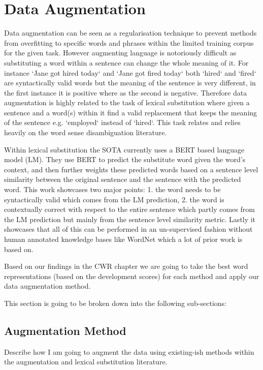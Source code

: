 \section{Data Augmentation}
Data augmentation can be seen as a regularisation technique to prevent methods from overfitting to specific words and phrases within the limited training corpus for the given task. However augmenting language is notoriously difficult as substituting a word within a sentence can change the whole meaning of it. For instance `Jane got hired today` and `Jane got fired today` both `hired` and `fired` are syntactically valid words but the meaning of the sentence is very different, in the first instance it is positive where as the second is negative. Therefore data augmentation is highly related to the task of lexical substitution \cite{mccarthy-navigli-2007-semeval} where given a sentence and a word(s) within it find a valid replacement that keeps the meaning of the sentence e.g. `employed` instead of `hired`. This task relates and relies heavily on the word sense disambiguation literature.

Within lexical substitution the SOTA currently \cite{zhou-etal-2019-bert} uses a BERT \cite{devlin-etal-2019-bert} based language model (LM). They use BERT to predict the substitute word given the word's context, and then further weights these predicted words based on a sentence level similarity between the original sentence and the sentence with the predicted word. This work showcases two major points: 1. the word needs to be syntactically valid which comes from the LM prediction, 2. the word is contextually correct with respect to the entire sentence which partly comes from the LM prediction but mainly from the sentence level similarity metric. Lastly it showcases that all of this can be performed in an un-supervised fashion without human annotated knowledge bases like WordNet which a lot of prior work is based on.





Based on our findings in the CWR chapter we are going to take the best word representations (based on the development scores) for each method and apply our data augmentation method.

This section is going to be broken down into the following sub-sections:
\subsection{Augmentation Method}
Describe how I am going to augment the data using existing-ish methods within the augmentation and lexical substitution literature.
